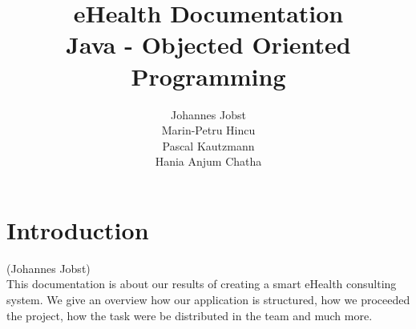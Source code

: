 \documentclass[a4paper, 12pt]{report}
\title{\textbf{eHealth Documentation}\\Java - Objected Oriented Programming}
\author{Johannes Jobst\\Marin-Petru Hincu\\Pascal Kautzmann\\Hania Anjum Chatha}
\begin{document}
\maketitle


\tableofcontents
\listoffigures

\chapter{Introduction}
{\tiny (Johannes Jobst)\\}
This documentation is about our results of creating a smart eHealth consulting system. We give an overview how our application is structured, how we proceeded the project, how the task were be distributed in the team and much more.
\end{document}
